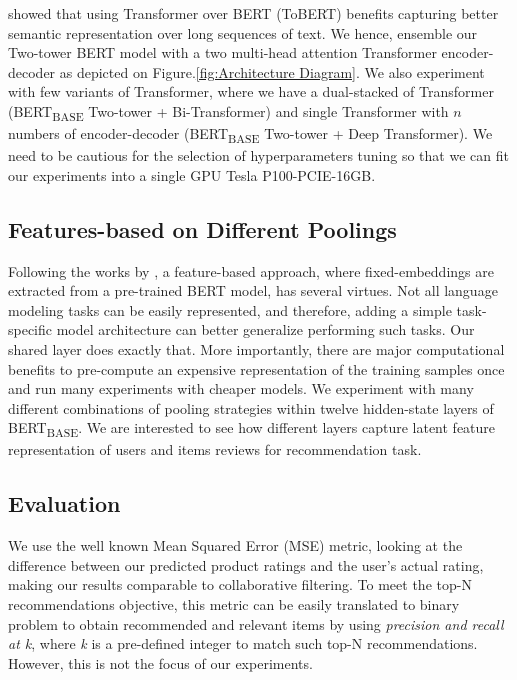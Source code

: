 \documentclass[11pt,a4paper]{article}
\begin{document}
\citet{raghavendra-transformer-2019} showed that using Transformer over BERT (ToBERT) benefits capturing better semantic representation over long sequences of text. We hence, ensemble our Two-tower BERT model with a two multi-head attention Transformer encoder-decoder as depicted on Figure.\ref{fig:Architecture Diagram}. We also experiment with few variants of Transformer, where we have a dual-stacked of Transformer (BERT\textsubscript{BASE} Two-tower + Bi-Transformer) and single Transformer with $n$ numbers of encoder-decoder (BERT\textsubscript{BASE} Two-tower + Deep Transformer). We need to be cautious for the selection of hyperparameters tuning so that we can fit our experiments into a single GPU Tesla P100-PCIE-16GB.

\subsection{Features-based on Different Poolings}

Following the works by \citet{devlin2019bert}, a feature-based approach, where fixed-embeddings are extracted from a pre-trained BERT model, has several virtues. Not all language modeling tasks can be easily represented, and therefore, adding a simple task-specific model architecture can better generalize performing such tasks. Our shared layer does exactly that. More importantly, there are major computational benefits to pre-compute an expensive representation of the training samples once and run many experiments with cheaper models. We experiment with many different combinations of pooling strategies within twelve hidden-state layers of BERT\textsubscript{BASE}. We are interested to see how different layers capture latent feature representation of users and items reviews for recommendation task.

\subsection{Evaluation}

We use the well known Mean Squared Error (MSE) metric, looking at the difference between our predicted product ratings and the user's actual rating, making our results comparable to collaborative filtering. To meet the top-N recommendations objective, this metric can be easily translated to binary problem to obtain recommended and relevant items by using \emph{precision and recall at k}, where \emph{k} is a pre-defined integer to match such top-N recommendations. However, this is not the focus of our experiments.
\end{document}
